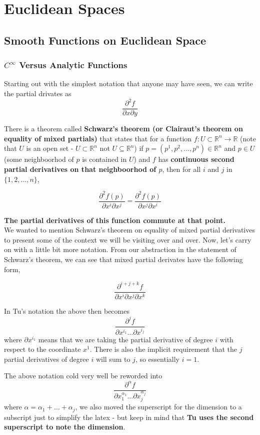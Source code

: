 \section{Euclidean Spaces}


\subsection{Smooth Functions on Euclidean Space}

\subsubsection{$C^\infty$ Versus Analytic Functions}

Starting out with the simplest notation that anyone may have seen, we can write the partial drivates
as
$$
\frac{\partial^2 f}{\partial x \partial y}
$$

There is a theorem called \textbf{Schwarz's theorem (or Clairaut's theorem on equality of mixed partials)}
that states that for a function $f : U \subset \mathbb{R}^n \rightarrow \mathbb{R} $
(note that $U$ is an open set - $U \subset \mathbb{R}^n$ not $U \subseteq \mathbb{R}^n$)
if $p = (p^1, p^2, \ldots , p^n) \in \mathbb{R}^n$
and $p \in U$ (some neighboorhod of $p$ is contained in $U$)
and $f$ has \textbf{continuous second partial derivatives on that neighboorhod of $p$},
then for all $i$ and $j$ in $\{ 1, 2, \ldots , n \}$,

$$
\frac{\partial^2 f (p)}{\partial x^i \partial x^j}
= \frac{\partial^2 f (p)}{\partial x^j \partial x^i}
$$

\textbf{The partial derivatives of this function commute at that point.}
\\

We wanted to mention Schwarz's theorem on equality of mixed partial derivatives to present some of the context
we will be visiting over and over.
Now, let's carry on with a little bit more notation.
From our abstraction in the statement of Schwarz's theorem, we can see that mixed partial derivates have the following
form,

$$
\frac{\partial^{i+j+k} f}{\partial x^i \partial x^j \partial x^k}
$$

In Tu's notation the above then becomes
$$
\frac{\partial^j f}{\partial x^{i_1} \ldots \partial x^{i_j}}
$$
where $\partial x^{i_1}$ means that we are taking the partial derivative of degree $i$ with respect to the
coordinate $x^1$.
There is also the implicit requirement that the $j$ partial derivatives of degree $i$ will sum to $j$, so essentially
$i=1$.

The above notation cold very well be reworded into
$$
\frac{\partial^\alpha f}{\partial x^{\alpha_1}_{1} \ldots \partial x^{\alpha_j}_{j}}
$$
where $\alpha = \alpha_1 + \ldots + \alpha_j$, we also moved the superscript for the dimension to a subscript just
to simplify the latex - but keep in mind that \textbf{Tu uses the second superscript to note the dimension}.